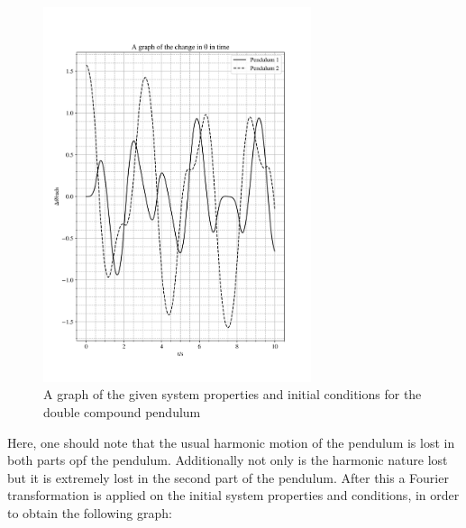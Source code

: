 \documentclass[12pt, a4paper]{article}
\begin{document}
\begin{figure}[H]
    \centering
    \includegraphics[width = 0.7\textwidth]{plots/Plot 3.1.png}\caption{A graph of the given system properties and initial conditions for the double compound pendulum}\label{fig: pendulum 2.1}
\end{figure}

Here, one should note that the usual harmonic motion of the pendulum is lost in both parts opf the pendulum. Additionally not only is the harmonic nature lost but it is extremely lost in the second part of the pendulum. After this a Fourier transformation is applied on the initial system properties and conditions, in order to obtain the following graph:
\end{document}
